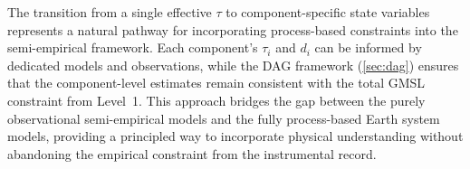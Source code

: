 \documentclass[11pt]{article}
\begin{document}
The transition from a single effective $\tau$ to component-specific state variables represents a natural pathway for incorporating process-based constraints into the semi-empirical framework.  Each component's $\tau_i$ and $d_i$ can be informed by dedicated models and observations, while the DAG framework (\cref{sec:dag}) ensures that the component-level estimates remain consistent with the total GMSL constraint from Level~1.  This approach bridges the gap between the purely observational semi-empirical models and the fully process-based Earth system models, providing a principled way to incorporate physical understanding without abandoning the empirical constraint from the instrumental record.




\end{document}
